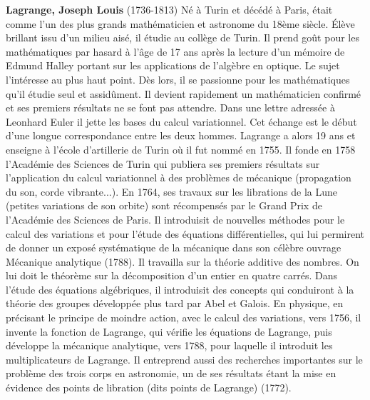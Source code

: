 \textbf{Lagrange, Joseph Louis} (1736-1813) Né à Turin et décédé à Paris, était comme l'un des plus grands mathématicien et astronome du 18ème siècle. Élève brillant issu d'un milieu aisé, il étudie au collège de Turin. Il prend goût pour les mathématiques par hasard à l'âge de 17 ans après la lecture d'un mémoire de Edmund Halley portant sur les applications de l'algèbre en optique. Le sujet l'intéresse au plus haut point. Dès lors, il se passionne pour les mathématiques qu'il étudie seul et assidûment. Il devient rapidement un mathématicien confirmé et ses premiers résultats ne se font pas attendre. Dans une lettre adressée à Leonhard Euler il jette les bases du calcul variationnel. Cet échange est le début d'une longue correspondance entre les deux hommes. Lagrange a alors 19 ans et enseigne à l'école d'artillerie de Turin où il fut nommé en 1755. Il fonde en 1758 l'Académie des Sciences de Turin qui publiera ses premiers résultats sur l'application du calcul variationnel à des problèmes de mécanique (propagation du son, corde vibrante...). En 1764, ses travaux sur les librations de la Lune (petites variations de son orbite) sont récompensés par le Grand Prix de l'Académie des Sciences de Paris. Il introduisit de nouvelles méthodes pour le calcul des variations et pour l'étude des équations différentielles, qui lui permirent de donner un exposé systématique de la mécanique dans son célèbre ouvrage Mécanique analytique (1788). Il travailla sur la théorie additive des nombres. On lui doit le théorème sur la décomposition d'un entier en quatre carrés. Dans l'étude des équations algébriques, il introduisit des concepts qui conduiront à la théorie des groupes développée plus tard par Abel et Galois. En physique, en précisant le principe de moindre action, avec le calcul des variations, vers 1756, il invente la fonction de Lagrange, qui vérifie les équations de Lagrange, puis développe la mécanique analytique, vers 1788, pour laquelle il introduit les multiplicateurs de Lagrange. Il entreprend aussi des recherches importantes sur le problème des trois corps en astronomie, un de ses résultats étant la mise en évidence des points de libration (dits points de Lagrange) (1772).

